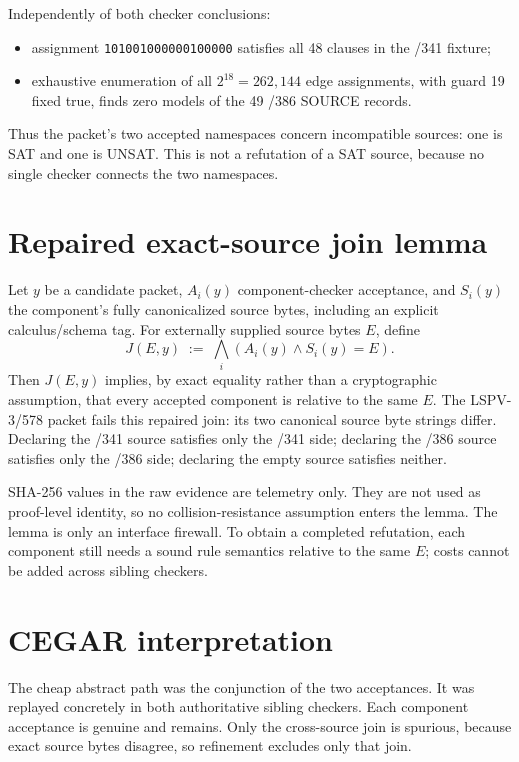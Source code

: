 \documentclass[11pt]{article}
\begin{document}
Independently of both checker conclusions:
\begin{itemize}
\item assignment \texttt{101001000000100000} satisfies all 48 clauses in
the /341 fixture;
\item exhaustive enumeration of all \(2^{18}=262{,}144\) edge assignments,
with guard 19 fixed true, finds zero models of the 49 /386 SOURCE records.
\end{itemize}
Thus the packet's two accepted namespaces concern incompatible sources:
one is SAT and one is UNSAT. This is not a refutation of a SAT source,
because no single checker connects the two namespaces.

\section*{Repaired exact-source join lemma}
Let \(y\) be a candidate packet, \(A_i(y)\) component-checker acceptance,
and \(S_i(y)\) the component's fully canonicalized source bytes, including
an explicit calculus/schema tag. For externally supplied source bytes
\(E\), define
\[
  J(E,y)\;:=\;\bigwedge_i\left(A_i(y)\wedge S_i(y)=E\right).
\]
Then \(J(E,y)\) implies, by exact equality rather than a cryptographic
assumption, that every accepted component is relative to the same \(E\).
The LSPV-3/578 packet fails this repaired join: its two canonical source
byte strings differ. Declaring the /341 source satisfies only the /341
side; declaring the /386 source satisfies only the /386 side; declaring
the empty source satisfies neither.

SHA-256 values in the raw evidence are telemetry only. They are not used
as proof-level identity, so no collision-resistance assumption enters the
lemma. The lemma is only an interface firewall. To obtain a completed
refutation, each component still needs a sound rule semantics relative to
the same \(E\); costs cannot be added across sibling checkers.

\section*{CEGAR interpretation}
The cheap abstract path was the conjunction of the two acceptances. It was
replayed concretely in both authoritative sibling checkers. Each component
acceptance is genuine and remains. Only the cross-source join is spurious,
because exact source bytes disagree, so refinement excludes only that join.
\end{document}
